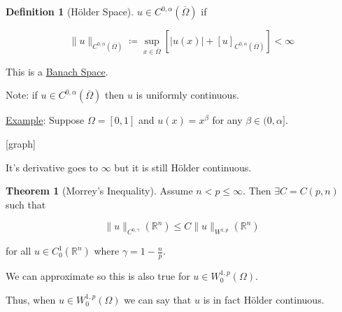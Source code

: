 \documentclass{article}
\theoremstyle{definition}
\newtheorem{definition}{Definition}
\newtheorem{theorem}{Theorem}
\begin{document}
\begin{definition}[H\"older Space]
    \(u\in C^{0,\alpha}(\overline{\Omega})\) if

    \[
        \lVert u \rVert _{C^{0,\alpha}(\overline{\Omega})} \coloneqq \sup_{x\in \overline{\Omega}} \left[ \vert u(x) \vert + [u]_{C^{0,\alpha}(\overline{\Omega})} \right] < \infty
    \]

    This is a \underline{Banach Space}.
\end{definition}

Note: if \(u\in C^{0,\alpha}(\overline{\Omega })\) then \(u\) is uniformly continuous. 

\underline{Example}: Suppose \(\Omega = [0,1]\) and \(u(x) = x^\beta\) for any \(\beta \in (0, \alpha]\).

[graph]

It's derivative goes to \(\infty\) but it is still H\"older continuous.

\begin{theorem}
    [Morrey's Inequality] Assume \(n < p \leq \infty\). Then \(\exists C = C(p,n)\) such that
    
    \[
        \lVert u \rVert _{C^{0,\gamma}}(\mathbb{R}^n) \leq C \lVert u \rVert _{W^{1,p}}(\mathbb{R}^n)
    \]

    for all \(u \in C_0^1(\mathbb{R}^n)\) where \(\gamma = 1-\frac{n}{p}\).
\end{theorem}

We can approximate so this is also true for \(u\in W^{1,p}_0(\Omega)\).

Thus, when \(u\in W^{1,p}_0(\Omega)\) we can say that \(u\) is in fact H\"older continuous.
\end{document}
